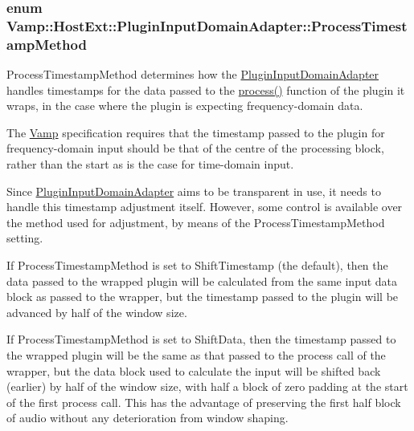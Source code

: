 \subsubsection[{\texorpdfstring{Process\+Timestamp\+Method}{ProcessTimestampMethod}}]{\setlength{\rightskip}{0pt plus 5cm}enum {\bf Vamp\+::\+Host\+Ext\+::\+Plugin\+Input\+Domain\+Adapter\+::\+Process\+Timestamp\+Method}}\hypertarget{class_vamp_1_1_host_ext_1_1_plugin_input_domain_adapter_a2518e4922d77bc4e514d84cec9a0b577}{}\label{class_vamp_1_1_host_ext_1_1_plugin_input_domain_adapter_a2518e4922d77bc4e514d84cec9a0b577}
Process\+Timestamp\+Method determines how the \hyperlink{class_vamp_1_1_host_ext_1_1_plugin_input_domain_adapter}{Plugin\+Input\+Domain\+Adapter} handles timestamps for the data passed to the \hyperlink{class_vamp_1_1_host_ext_1_1_plugin_input_domain_adapter_a0867737693c16801d40a6adbde07ec07}{process()} function of the plugin it wraps, in the case where the plugin is expecting frequency-\/domain data.

The \hyperlink{namespace_vamp}{Vamp} specification requires that the timestamp passed to the plugin for frequency-\/domain input should be that of the centre of the processing block, rather than the start as is the case for time-\/domain input.

Since \hyperlink{class_vamp_1_1_host_ext_1_1_plugin_input_domain_adapter}{Plugin\+Input\+Domain\+Adapter} aims to be transparent in use, it needs to handle this timestamp adjustment itself. However, some control is available over the method used for adjustment, by means of the Process\+Timestamp\+Method setting.

If Process\+Timestamp\+Method is set to Shift\+Timestamp (the default), then the data passed to the wrapped plugin will be calculated from the same input data block as passed to the wrapper, but the timestamp passed to the plugin will be advanced by half of the window size.

If Process\+Timestamp\+Method is set to Shift\+Data, then the timestamp passed to the wrapped plugin will be the same as that passed to the process call of the wrapper, but the data block used to calculate the input will be shifted back (earlier) by half of the window size, with half a block of zero padding at the start of the first process call. This has the advantage of preserving the first half block of audio without any deterioration from window shaping.

